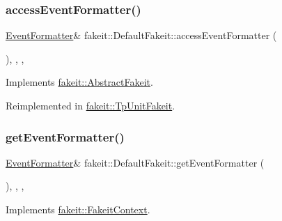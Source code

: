 \subsubsection{\texorpdfstring{accessEventFormatter()}{accessEventFormatter()}\hspace{0.1cm}{\footnotesize\ttfamily [9/9]}}
{\footnotesize\ttfamily \mbox{\hyperlink{structfakeit_1_1EventFormatter}{Event\+Formatter}}\& fakeit\+::\+Default\+Fakeit\+::access\+Event\+Formatter (\begin{DoxyParamCaption}{ }\end{DoxyParamCaption})\hspace{0.3cm}{\ttfamily [inline]}, {\ttfamily [override]}, {\ttfamily [protected]}, {\ttfamily [virtual]}}



Implements \mbox{\hyperlink{classfakeit_1_1AbstractFakeit_a443a7ac12208c55f2ae4fa072e983476}{fakeit\+::\+Abstract\+Fakeit}}.



Reimplemented in \mbox{\hyperlink{classfakeit_1_1TpUnitFakeit_ae0f3713842b30e36ee1b0ce03a070b59}{fakeit\+::\+Tp\+Unit\+Fakeit}}.

\mbox{\label{classfakeit_1_1DefaultFakeit_ae06b5536bcde628ed7e32499eb8b9ac3}} 
\subsubsection{\texorpdfstring{getEventFormatter()}{getEventFormatter()}\hspace{0.1cm}{\footnotesize\ttfamily [1/9]}}
{\footnotesize\ttfamily \mbox{\hyperlink{structfakeit_1_1EventFormatter}{Event\+Formatter}}\& fakeit\+::\+Default\+Fakeit\+::get\+Event\+Formatter (\begin{DoxyParamCaption}{ }\end{DoxyParamCaption})\hspace{0.3cm}{\ttfamily [inline]}, {\ttfamily [override]}, {\ttfamily [protected]}, {\ttfamily [virtual]}}



Implements \mbox{\hyperlink{structfakeit_1_1FakeitContext_a066d191292b1002025b02f6569f48b9b}{fakeit\+::\+Fakeit\+Context}}.

\mbox{\label{classfakeit_1_1DefaultFakeit_ae06b5536bcde628ed7e32499eb8b9ac3}} 
